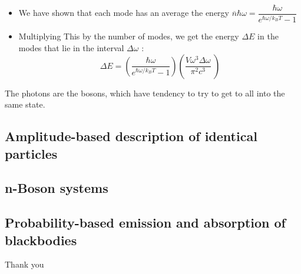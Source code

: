 \documentclass[aspectratio=169]{beamer}
\begin{document}
\begin{frame}
	\begin{itemize}
		\item We have shown that each mode has an average the energy \pause \newline 
		$ \overline{n}\hbar\omega = \dfrac{\hbar\omega}{e^{\hbar\omega/k_{B}T} - 1}$\pause \newline
		\item Multiplying This by the number of modes, we get the energy $\Delta E$ in the modes that lie in the interval $\Delta\omega$ :
		\[\Delta E = \left( \dfrac{\hbar\omega}{e^{\hbar\omega/k_{B}T} - 1} \right) \left(\dfrac{V\omega^3\Delta \omega}{\pi^2 c^3}\ \right) \]
		
	\end{itemize}
\end{frame}

\begin{frame}
	\begin{center}
		{\large The photons are the bosons, which have tendency to try to get to all into the same state.}
	\end{center}
\end{frame}


\subsection{Amplitude-based description of identical particles}

\subsection{n-Boson systems}

\subsection{Probability-based emission and absorption of blackbodies}

\begin{frame}

	\begin{center}
{\Large Thank you}
	\end{center}
	
\end{frame}
\end{document}
